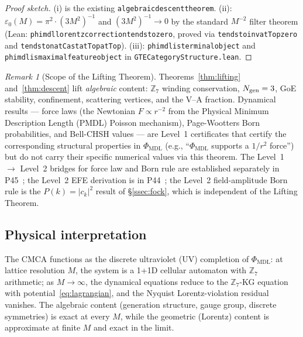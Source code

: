 \documentclass[11pt]{article}
\theoremstyle{remark}
\newtheorem{remark}[theorem]{Remark}
\newcommand{\PHIMDL}{\Phi_{\mathrm{MDL}}}
\newcommand{\ZS}{\mathbb{Z}_7}
\newcommand{\lean}[1]{%
  \penalty-100
  \begingroup\def\_{\textunderscore\allowbreak}\texttt{#1}\endgroup}
\newcommand{\epsz}{\varepsilon_0}
\begin{document}
\begin{proof}[Proof sketch]
  (i) is the existing \lean{algebraic\_descent\_theorem}.
  (ii): $\epsz(M) = \pi^2\cdot(3M^2)^{-1}$ and $(3M^2)^{-1}\to 0$ by the
  standard $M^{-2}$ filter theorem (Lean: \lean{phimdl\_lorentz\_correction\_tendsto\_zero},
  proved via \lean{tendsto\_inv\_atTop\_zero} and \lean{tendsto\_natCast\_atTop\_atTop}).
  (iii): \lean{phimdl\_is\_terminal\_object} and
  \lean{phimdl\_is\_maximal\_feature\_object} in \lean{GTECategoryStructure.lean}.
\end{proof}

\begin{remark}[Scope of the Lifting Theorem]
\label{rem:lifting-scope}
Theorems~\ref{thm:lifting} and~\ref{thm:descent} lift \emph{algebraic} content:
$\ZS$ winding conservation, $N_{\rm gen}=3$, GoE stability, confinement, scattering
vertices, and the V--A fraction.  Dynamical results --- force laws (the Newtonian
$F\propto r^{-2}$ from the Physical Minimum Description Length (PMDL) Poisson mechanism), Page-Wootters Born probabilities,
and Bell-CHSH values --- are Level~1 certificates that certify the corresponding
structural properties in $\PHIMDL$ (e.g., ``$\PHIMDL$ supports a $1/r^2$ force'')
but do not carry their specific numerical values via this theorem.  The Level~1
$\to$ Level~2 bridges for force law and Born rule are established separately in
P45~\cite{SpivackThreeTapeCMCA}; the Level~2 EFE derivation is in
P44~\cite{SpivackQGR}; the Level~2 field-amplitude Born rule is the $P(k)=|c_k|^2$
result of \S\ref{ssec:fock}, which is independent of the Lifting Theorem.
\end{remark}

\subsection{Physical interpretation}
\label{ssec:interpretation}

The CMCA functions as the discrete ultraviolet (UV) completion of $\PHIMDL$:
at lattice resolution $M$, the system is a 1+1D cellular automaton with
$\ZS$ arithmetic; as $M\to\infty$, the dynamical equations reduce to the
$\ZS$-KG equation with potential~\eqref{eq:lagrangian}, and the Nyquist
Lorentz-violation residual vanishes.  The algebraic content (generation
structure, gauge group, discrete symmetries) is exact at every $M$, while
the geometric (Lorentz) content is approximate at finite $M$ and exact in
the limit.

\end{document}
